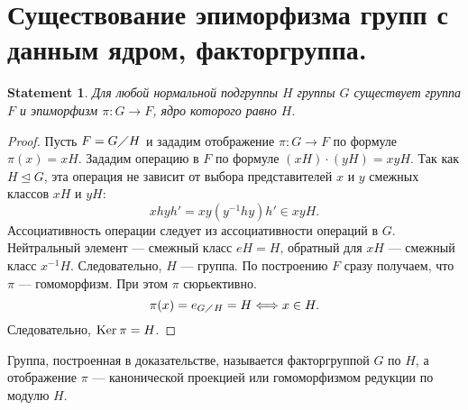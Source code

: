 \documentclass[11pt]{book}
\newcommand{\po}{\diagup}
\renewcommand{\ker}{{\mathop{\text{\rm Ker}}}\:}
\theoremstyle{definition}
\theoremstyle{plain}
\theoremstyle{plain}
\newtheorem{st}{Statement}
\theoremstyle{definition}
\theoremstyle{remark}
\begin{document}
\section{Существование эпиморфизма групп с данным ядром, факторгруппа.}
\begin{st}
    Для любой нормальной подгруппы $ H$ группы  $ G$ существует группа  $ F$ и эпиморфизм  $\pi : G \to F$, ядро которого равно  $ H$.
\end{st}
\begin{proof}
    Пусть $ F = G \po H$ и зададим отображение  $ \pi: G \to F$ по формуле $ \pi(x) = xH$. Зададим операцию в $ F$ по формуле  $ (xH) \cdot (yH) = xyH$. Так как $ H \trianglelefteq G$, эта операция не зависит от выбора представителей $ x $ и $ y$ смежных классов  $ xH$ и  $ yH$:
    \[
	xhyh' = xy(y^{-1}hy)h' \in xyH
    .\]
    Ассоциативность операции следует из ассоциативности операций в $ G$. Нейтральный элемент --- смежный класс $ eH =H $, обратный для  $ xH$ --- смежный класс  $ x^{-1}H$. Следовательно, $ H$ --- группа. По построению  $ F$ сразу получаем, что  $ \pi$ --- гомоморфизм. При этом $ \pi$ сюрьективно.
    \[
	\pi(x) = e_{G \po H} = H \Longleftrightarrow x \in H
    .\]
    Следовательно, $ \ker \pi = H$.
\end{proof}
\begin{defn}
    Группа, построенная в доказательстве, называется {\sf факторгруппой} $ G$ по  $ H$, а отображение $ \pi$ --- {\sf канонической проекцией} или {\sf гомоморфизмом  редукции по модулю} $ H$.
\end{defn}
\end{document}

